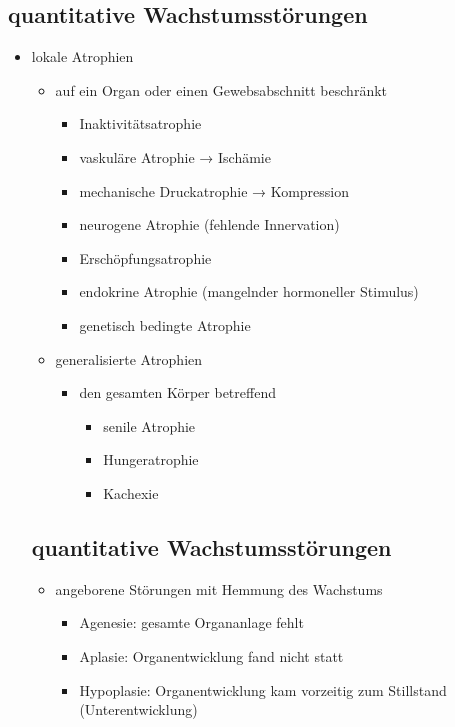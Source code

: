 \begin{it>emize}
\subsection{quantitative Wachstumsstörungen}
\begin{itemize}
\item lokale Atrophien
\begin{itemize}
\item auf ein Organ oder einen Gewebsabschnitt beschränkt
\begin{itemize}
\item Inaktivitätsatrophie
\item vaskuläre Atrophie → Ischämie
\item mechanische Druckatrophie → Kompression
\item neurogene Atrophie (fehlende Innervation)
\item Erschöpfungsatrophie
\item endokrine Atrophie (mangelnder hormoneller Stimulus)
\item genetisch bedingte Atrophie
\end{itemize}
\item generalisierte Atrophien
\begin{itemize}
\item den gesamten Körper betreffend
\begin{itemize}
\item senile Atrophie
\item Hungeratrophie
\item Kachexie
\end{itemize}
\end{itemize}
\end{itemize}

\subsection{quantitative Wachstumsstörungen}
\begin{itemize}
\item angeborene Störungen mit Hemmung des Wachstums
\begin{itemize}
\item Agenesie: gesamte Organanlage fehlt
\item Aplasie: Organentwicklung fand nicht statt
\item Hypoplasie: Organentwicklung kam vorzeitig zum Stillstand (Unterentwicklung)
\end{itemize}
\end{itemize}


\end{itemize}
\end{it>emize}
